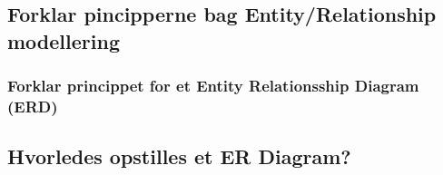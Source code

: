\newpage

\subsection{Forklar pincipperne bag Entity/Relationship modellering}

\subsubsection{Forklar princippet for et Entity Relationsship Diagram (ERD)}

\subsection{Hvorledes opstilles et ER Diagram?}